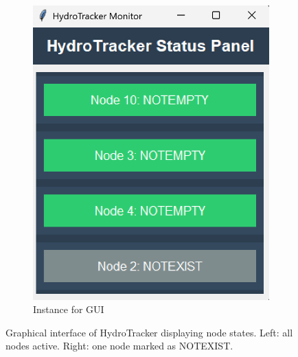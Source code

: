 \begin{figure}[H]
\begin{subfigure}[b]{0.4\linewidth}
        \includegraphics[width=\linewidth]{assets/gui_images/gui_screenshot_2.png}
        \caption{Instance for GUI}
        \label{fig:subfig2}
    \end{subfigure}
\caption{Graphical interface of HydroTracker displaying node states. Left: all nodes active. Right: one node marked as NOTEXIST.}
    \label{fig:combined}
\end{figure}

